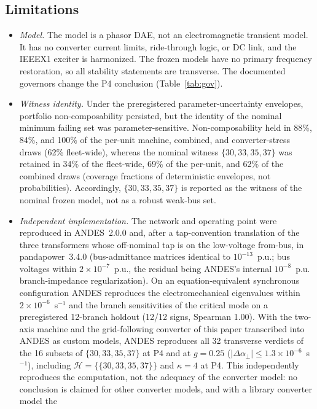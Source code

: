 \documentclass[journal]{IEEEtran}
\theoremstyle{definition}
\theoremstyle{remark}
\newcommand{\Hy}{\mathcal{H}}
\begin{document}
\subsection{Limitations}
\begin{itemize}
\item \emph{Model.} The model is a phasor DAE, not an electromagnetic transient
model. It has no converter current limits, ride-through logic, or DC link, and
the IEEEX1 exciter is harmonized. The frozen models have no primary frequency
restoration, so all stability statements are transverse. The documented
governors change the P4 conclusion (Table~\ref{tab:gov}).
\item \emph{Witness identity.} Under the preregistered parameter-uncertainty
envelopes, portfolio non-composability persisted, but the identity of the
nominal minimum failing set was parameter-sensitive. Non-composability held in
88\%, 84\%, and 100\% of the per-unit machine, combined, and converter-stress
draws (62\% fleet-wide), whereas the nominal witness $\{30,33,35,37\}$ was
retained in 34\% of the fleet-wide, 69\% of the per-unit, and 62\% of the
combined draws (coverage fractions of deterministic envelopes, not
probabilities). Accordingly, $\{30,33,35,37\}$ is reported as the witness of
the nominal frozen model, not as a robust weak-bus set.
\item \emph{Independent implementation.} The network and operating point were
reproduced in ANDES~2.0.0 and, after a tap-convention translation of the three
transformers whose off-nominal tap is on the low-voltage from-bus, in
pandapower~3.4.0 \cite{thurner2018pandapower} (bus-admittance matrices
identical to $10^{-13}$~p.u.; bus voltages within $2\times10^{-7}$~p.u., the
residual being ANDES's internal $10^{-8}$~p.u. branch-impedance
regularization). On an equation-equivalent synchronous configuration ANDES
reproduces the electromechanical eigenvalues within $2\times10^{-6}$~s$^{-1}$
and the branch sensitivities of the critical mode on a preregistered 12-branch
holdout (12/12 signs, Spearman 1.00). With the two-axis machine and the
grid-following converter of this paper transcribed into ANDES as custom
models, ANDES reproduces all 32 transverse verdicts of the 16 subsets of
$\{30,33,35,37\}$ at P4 and at $g=0.25$
($|\Delta\alpha_\perp|\le1.3\times10^{-6}$~s$^{-1}$), including
$\Hy=\{\{30,33,35,37\}\}$ and $\kappa=4$ at P4. This independently reproduces
the computation, not the adequacy of the converter model: no conclusion is
claimed for other converter models, and with a library converter model the

\end{itemize}
\end{document}
